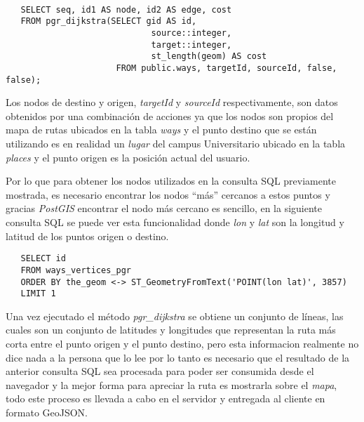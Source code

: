 \begin{center}
 \begin{lstlisting}[label=pgr_dijkstra,caption=Algoritmo de Dijkstra implementado en \emph{pRouting}]

   SELECT seq, id1 AS node, id2 AS edge, cost
   FROM pgr_dijkstra(SELECT gid AS id,
                             source::integer,
                             target::integer,
                             st_length(geom) AS cost
                      FROM public.ways, targetId, sourceId, false, false);

 \end{lstlisting}
\end{center}



Los nodos de destino y origen, \emph{targetId} y \emph{sourceId} respectivamente, son datos obtenidos por una combinación de acciones ya que los nodos son propios del mapa de rutas ubicados en la tabla \emph{ways} y el punto destino que se están utilizando es en realidad un \emph{lugar} del campus Universitario ubicado en la tabla \emph{places} y el punto origen es la posición actual del usuario.

Por lo que para obtener los nodos utilizados en la consulta SQL previamente mostrada, es necesario encontrar los nodos ``más'' cercanos a estos puntos y gracias \emph{PostGIS} encontrar el nodo más cercano es sencillo, en la siguiente consulta SQL se puede ver esta funcionalidad  donde \emph{lon} y \emph{lat} son la longitud y latitud de los puntos origen o destino. \\

\begin{verbatim}
   SELECT id
   FROM ways_vertices_pgr
   ORDER BY the_geom <-> ST_GeometryFromText('POINT(lon lat)', 3857)
   LIMIT 1
\end{verbatim}

Una vez ejecutado el método \emph{pgr\_dijkstra} se obtiene un conjunto de líneas, las cuales son un conjunto de latitudes y longitudes que representan la ruta más corta entre el punto origen y el punto destino, pero esta informacion realmente no dice nada a la persona que lo lee por lo tanto es necesario que el resultado de la anterior consulta SQL sea procesada para poder ser consumida desde el navegador y la mejor forma para apreciar la ruta es mostrarla sobre el \emph{mapa}, todo este proceso es llevada a cabo en el servidor y entregada al cliente en formato GeoJSON.\\







